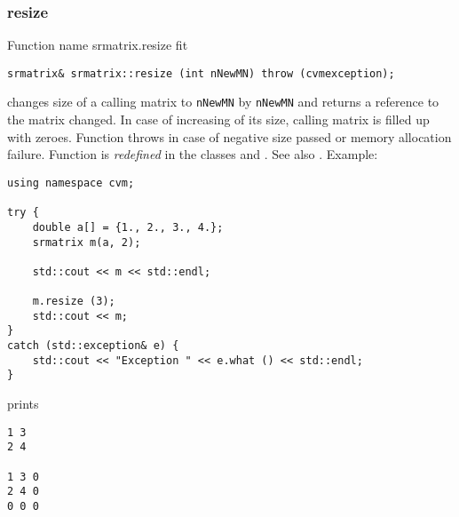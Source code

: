 \subsubsection{resize}
Function%
\pdfdest name {srmatrix.resize} fit
\begin{verbatim}
srmatrix& srmatrix::resize (int nNewMN) throw (cvmexception);
\end{verbatim}
changes  size of a calling matrix to \verb"nNewMN" by \verb"nNewMN"
and returns a reference to
the matrix changed. In case of increasing of its size, calling matrix
is filled up with zeroes.
Function throws  
in case of negative size passed or memory allocation failure.
Function is \emph{redefined} in the classes
and .
See also .
Example:
\begin{Verbatim}
using namespace cvm;

try {
    double a[] = {1., 2., 3., 4.};
    srmatrix m(a, 2);

    std::cout << m << std::endl;

    m.resize (3);
    std::cout << m;
}
catch (std::exception& e) {
    std::cout << "Exception " << e.what () << std::endl;
}
\end{Verbatim}
prints
\begin{Verbatim}
1 3
2 4

1 3 0
2 4 0
0 0 0
\end{Verbatim}
\newpage



